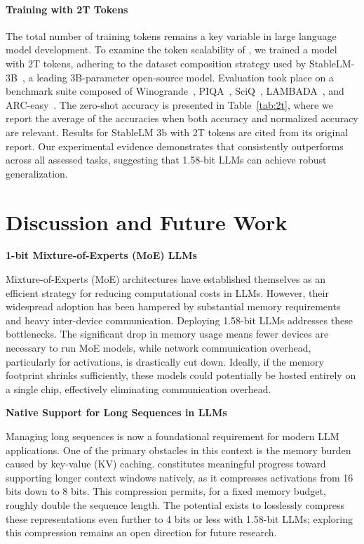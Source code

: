 \paragraph{Training with 2T Tokens}

The total number of training tokens remains a key variable in large language model development. To examine the token scalability of , we trained a  model with 2T tokens, adhering to the dataset composition strategy used by StableLM-3B~\cite{StableLM-3B-4E1T}, a leading 3B-parameter open-source model. Evaluation took place on a benchmark suite composed of Winogrande~\cite{winoGrande}, PIQA~\cite{piqa}, SciQ~\cite{sciq}, LAMBADA~\cite{lambada}, and ARC-easy~\cite{arc}. The zero-shot accuracy is presented in Table~\ref{tab:2t}, where we report the average of the accuracies when both accuracy and normalized accuracy are relevant. Results for StableLM 3b with 2T tokens are cited from its original report. Our experimental evidence demonstrates that  consistently outperforms across all assessed tasks, suggesting that 1.58-bit LLMs can achieve robust generalization.

\section{Discussion and Future Work}

\textbf{1-bit Mixture-of-Experts (MoE) LLMs}

Mixture-of-Experts (MoE) architectures have established themselves as an efficient strategy for reducing computational costs in LLMs. However, their widespread adoption has been hampered by substantial memory requirements and heavy inter-device communication. Deploying 1.58-bit LLMs addresses these bottlenecks. The significant drop in memory usage means fewer devices are necessary to run MoE models, while network communication overhead, particularly for activations, is drastically cut down. Ideally, if the memory footprint shrinks sufficiently, these models could potentially be hosted entirely on a single chip, effectively eliminating communication overhead.

\textbf{Native Support for Long Sequences in LLMs}

Managing long sequences is now a foundational requirement for modern LLM applications. One of the primary obstacles in this context is the memory burden caused by key-value (KV) caching.  constitutes meaningful progress toward supporting longer context windows natively, as it compresses activations from 16 bits down to 8 bits. This compression permits, for a fixed memory budget, roughly double the sequence length. The potential exists to losslessly compress these representations even further to 4 bits or less with 1.58-bit LLMs; exploring this compression remains an open direction for future research.

